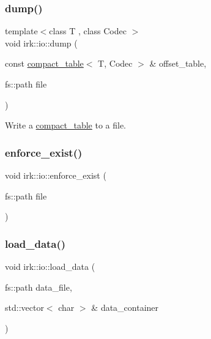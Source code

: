 \subsubsection{\texorpdfstring{dump()}{dump()}}
{\footnotesize\ttfamily template$<$class T , class Codec $>$ \\
void irk\+::io\+::dump (\begin{DoxyParamCaption}\item[{const \mbox{\hyperlink{classirk_1_1compact__table}{compact\+\_\+table}}$<$ T, Codec $>$ \&}]{offset\+\_\+table,  }\item[{fs\+::path}]{file }\end{DoxyParamCaption})}



Write a {\ttfamily \mbox{\hyperlink{classirk_1_1compact__table}{compact\+\_\+table}}} to a file. 

\mbox{\label{namespaceirk_1_1io_aae2b76d3f044ad43f8b25e08a142285f}} 
\subsubsection{\texorpdfstring{enforce\+\_\+exist()}{enforce\_exist()}}
{\footnotesize\ttfamily void irk\+::io\+::enforce\+\_\+exist (\begin{DoxyParamCaption}\item[{fs\+::path}]{file }\end{DoxyParamCaption})}

\mbox{\label{namespaceirk_1_1io_aa680509002f530048131492dea584724}} 
\subsubsection{\texorpdfstring{load\+\_\+data()}{load\_data()}}
{\footnotesize\ttfamily void irk\+::io\+::load\+\_\+data (\begin{DoxyParamCaption}\item[{fs\+::path}]{data\+\_\+file,  }\item[{std\+::vector$<$ char $>$ \&}]{data\+\_\+container }\end{DoxyParamCaption})}


